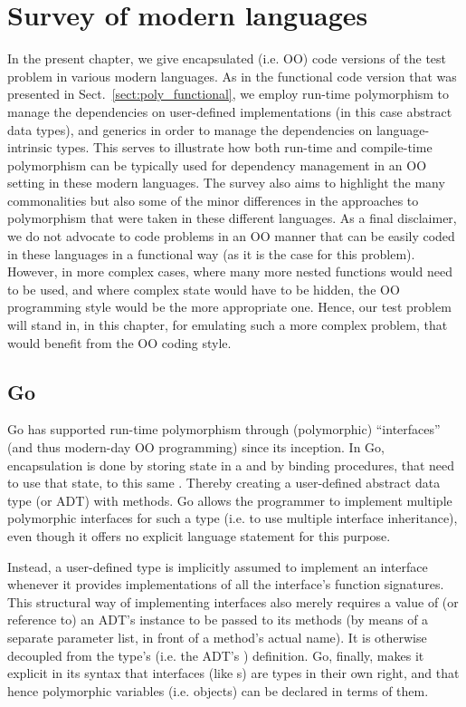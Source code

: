 \documentclass[11pt,oneside]{report}
\newcommand{\code}[1]{{\selectfont\ttfamily{#1}}}
\begin{document}
\chapter{Survey of modern languages}
\label{chapt:survey}

In the present chapter, we give encapsulated (i.e. OO) code versions
of the test problem in various modern languages. As in the functional
code version that was presented in Sect.~\ref{sect:poly_functional},
we employ run-time polymorphism to manage the dependencies on
user-defined implementations (in this case abstract data types), and
generics in order to manage the dependencies on language-intrinsic
types. This serves to illustrate how both run-time and compile-time
polymorphism can be typically used for dependency management in an OO
setting in these modern languages. The survey also aims to highlight
the many commonalities but also some of the minor differences in the
approaches to polymorphism that were taken in these different
languages. As a final disclaimer, we do not advocate to code problems
in an OO manner that can be easily coded in these languages in a
functional way (as it is the case for this problem). However, in more
complex cases, where many more nested functions would need to be used,
and where complex state would have to be hidden, the OO programming style
would be the more appropriate one. Hence, our test problem will stand
in, in this chapter, for emulating such a more complex problem, that
would benefit from the OO coding style.

\section{Go}

Go has supported run-time polymorphism through (polymorphic)
``interfaces'' (and thus modern-day OO programming) since its
inception. In Go, encapsulation is done by storing state in a
\code{struct} and by binding procedures, that need to use that
state, to this same \code{struct}. Thereby creating a user-defined
abstract data type (or ADT) with methods. Go allows the programmer to
implement multiple polymorphic interfaces for such a type (i.e. to use
multiple interface inheritance), even though it offers no explicit
language statement for this purpose.

Instead, a user-defined type is implicitly assumed to implement an
interface whenever it provides implementations of all the interface's
function signatures. This structural way of implementing interfaces
also merely requires a value of (or reference to) an ADT's instance to
be passed to its methods (by means of a separate parameter list, in
front of a method's actual name). It is otherwise decoupled from the
type's (i.e. the ADT's \code{struct}) definition. Go, finally, makes
it explicit in its syntax that interfaces (like \code{struct}s) are
types in their own right, and that hence polymorphic variables
(i.e. objects) can be declared in terms of them.
\end{document}
